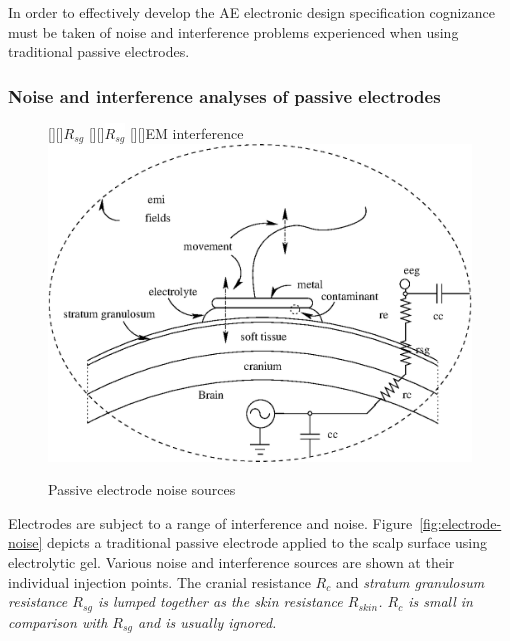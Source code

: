 In order to effectively develop the AE electronic design specification
cognizance must be taken of noise and interference problems
experienced when using traditional passive electrodes.

\subsubsection{Noise and interference analyses of passive electrodes}
\label{section:passive-analyses}
\begin{figure}[htb]
	\begin{center}
	[][]{$R_{sg}$}
	[][]{\colorbox{white}{$R_{sg}$}}
	[][]{EM interference}
	\includegraphics[width=\textwidth]{electrode-noise.eps}
	\caption{Passive electrode noise sources}
	\label{fig:electrode-noise} 
	\end{center}
\end{figure}


Electrodes are subject to a range of interference and noise.
Figure~\vref{fig:electrode-noise} depicts a traditional passive
electrode applied to the scalp surface using electrolytic gel. Various
noise and interference sources are shown at their individual injection
points. The cranial resistance $R_c$ and \em stratum granulosum \em
resistance $R_{sg}$ is lumped together as the skin resistance
$R_{skin}$. $R_c$ is small in comparison with $R_{sg}$ and is usually
ignored.


